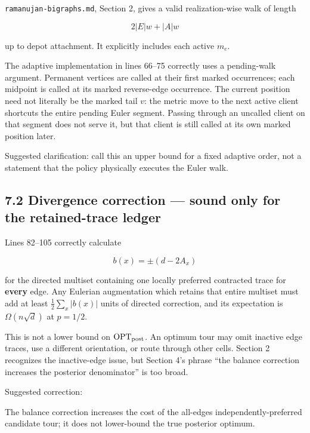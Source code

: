 \documentclass[11pt,a4paper]{article}
\begin{document}
\nolinkurl{ramanujan-bigraphs.md}, Section 2, gives a valid realization-wise walk of length


\[
 2|E|w+|A|w
\]

up to depot attachment.  It explicitly includes each active \(m_e\).


The adaptive implementation in lines 66–75 correctly uses a pending-walk argument.  Permanent vertices are called at their first marked occurrences; each midpoint is called at its marked reverse-edge occurrence.  The current position need not literally be the marked tail \(v\): the metric move to the next active client shortcuts the entire pending Euler segment.  Passing through an uncalled client on that segment does not serve it, but that client is still called at its own marked position later.


Suggested clarification: call this an upper bound for a fixed adaptive order, not a statement that the policy physically executes the Euler walk.


\subsection*{7.2 Divergence correction — sound only for the retained-trace ledger}

Lines 82–105 correctly calculate


\[
 b(x)=\pm(d-2A_x)
\]

for the directed multiset containing one locally preferred contracted trace for \textbf{every} edge.  Any Eulerian augmentation which retains that entire multiset must add at least \(\frac12\sum_x|b(x)|\) units of directed correction, and its expectation is \(\Omega(n\sqrt d)\) at \(p=1/2\).


This is not a lower bound on \(\operatorname{OPT}_{\rm post}\).  An optimum tour may omit inactive edge traces, use a different orientation, or route through other cells.  Section 2 recognizes the inactive-edge issue, but Section 4's phrase “the balance correction increases the posterior denominator” is too broad.


Suggested correction:


\begin{ResearchQuote}

The balance correction increases the cost of the all-edges independently-preferred candidate tour; it does not lower-bound the true posterior optimum.

\end{ResearchQuote}
\end{document}
